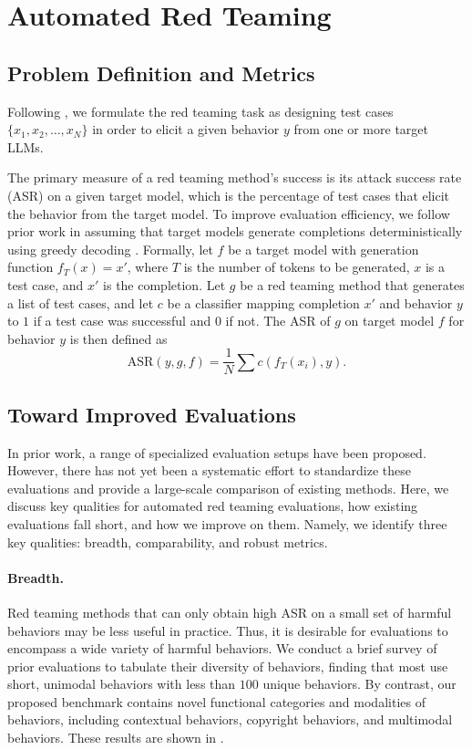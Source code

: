 \section{Automated Red Teaming}\label{sec:automated_red_teaming}

\subsection{Problem Definition and Metrics}\label{sec:problem_definition}
Following \citet{perez2022red, zou2023universal}, we formulate the red teaming task as designing test cases $\{x_1, x_2, \dotsc, x_N\}$ in order to elicit a given behavior $y$ from one or more target LLMs.

The primary measure of a red teaming method's success is its attack success rate (ASR) on a given target model, which is the percentage of test cases that elicit the behavior from the target model. To improve evaluation efficiency, we follow prior work in assuming that target models generate completions deterministically using greedy decoding \citep{zou2023universal, chao2023jailbreaking, mehrotra2023treeOfAttacks}. Formally, let $f$ be a target model with generation function $f_T(x) = x'$, where $T$ is the number of tokens to be generated, $x$ is a test case, and $x'$ is the completion. Let $g$ be a red teaming method that generates a list of test cases, and let $c$ be a classifier mapping completion $x'$ and behavior $y$ to $1$ if a test case was successful and $0$ if not. The ASR of $g$ on target model $f$ for behavior $y$ is then defined as
\[\text{ASR}(y, g, f) = \frac{1}{N}\sum c(f_T(x_i), y).\]



\subsection{Toward Improved Evaluations}\label{sec:improved_evaluations}
In prior work, a range of specialized evaluation setups have been proposed. However, there has not yet been a systematic effort to standardize these evaluations and provide a large-scale comparison of existing methods. Here, we discuss key qualities for automated red teaming evaluations, how existing evaluations fall short, and how we improve on them. Namely, we identify three key qualities: breadth, comparability, and robust metrics.

\paragraph{Breadth.}
Red teaming methods that can only obtain high ASR on a small set of harmful behaviors may be less useful in practice. Thus, it is desirable for evaluations to encompass a wide variety of harmful behaviors. We conduct a brief survey of prior evaluations to tabulate their diversity of behaviors, finding that most use short, unimodal behaviors with less than $100$ unique behaviors. By contrast, our proposed benchmark contains novel functional categories and modalities of behaviors, including contextual behaviors, copyright behaviors, and multimodal behaviors. These results are shown in .

